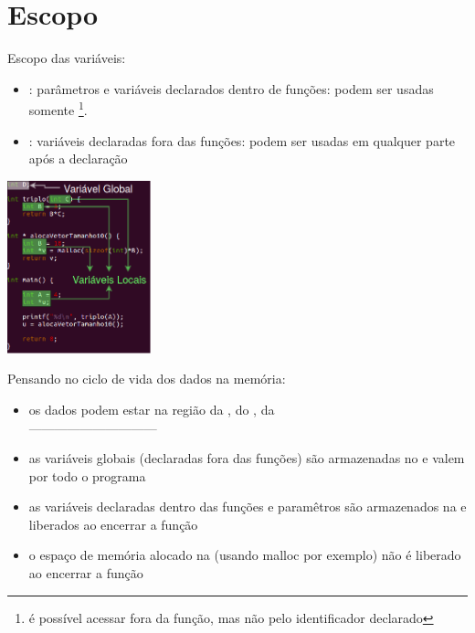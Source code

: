 \documentclass[portuguese,10pt,xcolor=table]{bredelebeamer}
\begin{document}

	\section{Escopo}
	\begin{frame}
		\begin{center}
		\end{center}
	\end{frame} 

	\begin{frame}
		Escopo das variáveis:
		\begin{itemize}
			\item {}: parâmetros e variáveis declarados dentro de funções: podem ser usadas somente  \footnote{é possível acessar fora da função, mas não pelo identificador declarado}.
			\item {}: variáveis declaradas fora das funções: podem ser usadas em qualquer parte após a declaração
		\end{itemize}
			\includegraphics[height=5.0cm]{localVsGlobal.png}\\
	\end{frame}

	\begin{frame}
		Pensando no ciclo de vida dos dados na memória:
				\begin{itemize}
					\item os dados podem estar na região da , do , da \\------------------------------
					\item as variáveis globais (declaradas fora das funções) são armazenadas no  e valem por todo o programa
					\item as variáveis declaradas dentro das funções e paramêtros são armazenados na  e liberados ao encerrar a função
					\item o espaço de memória alocado na  (usando malloc por exemplo) não é liberado ao encerrar a função
				\end{itemize}
	\end{frame}
\end{document}
